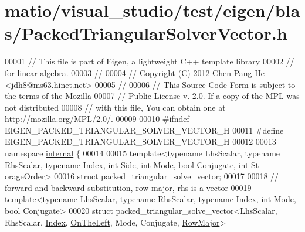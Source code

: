 \hypertarget{matio_2visual__studio_2test_2eigen_2blas_2_packed_triangular_solver_vector_8h_source}{}\section{matio/visual\+\_\+studio/test/eigen/blas/\+Packed\+Triangular\+Solver\+Vector.h}
\label{matio_2visual__studio_2test_2eigen_2blas_2_packed_triangular_solver_vector_8h_source}

\begin{DoxyCode}
00001 \textcolor{comment}{// This file is part of Eigen, a lightweight C++ template library}
00002 \textcolor{comment}{// for linear algebra.}
00003 \textcolor{comment}{//}
00004 \textcolor{comment}{// Copyright (C) 2012 Chen-Pang He <jdh8@ms63.hinet.net>}
00005 \textcolor{comment}{//}
00006 \textcolor{comment}{// This Source Code Form is subject to the terms of the Mozilla}
00007 \textcolor{comment}{// Public License v. 2.0. If a copy of the MPL was not distributed}
00008 \textcolor{comment}{// with this file, You can obtain one at http://mozilla.org/MPL/2.0/.}
00009 
00010 \textcolor{preprocessor}{#ifndef EIGEN\_PACKED\_TRIANGULAR\_SOLVER\_VECTOR\_H}
00011 \textcolor{preprocessor}{#define EIGEN\_PACKED\_TRIANGULAR\_SOLVER\_VECTOR\_H}
00012 
00013 \textcolor{keyword}{namespace }\hyperlink{namespaceinternal}{internal} \{
00014 
00015 \textcolor{keyword}{template}<\textcolor{keyword}{typename} LhsScalar, \textcolor{keyword}{typename} RhsScalar, \textcolor{keyword}{typename} Index, \textcolor{keywordtype}{int} S\textcolor{keywordtype}{id}e, \textcolor{keywordtype}{int} Mode, \textcolor{keywordtype}{bool} Conjugate, \textcolor{keywordtype}{int} St
      orageOrder>
00016 \textcolor{keyword}{struct }packed\_triangular\_solve\_vector;
00017 
00018 \textcolor{comment}{// forward and backward substitution, row-major, rhs is a vector}
00019 \textcolor{keyword}{template}<\textcolor{keyword}{typename} LhsScalar, \textcolor{keyword}{typename} RhsScalar, \textcolor{keyword}{typename} Index, \textcolor{keywordtype}{int} Mode, \textcolor{keywordtype}{bool} Conjugate>
00020 \textcolor{keyword}{struct }packed\_triangular\_solve\_vector<LhsScalar, RhsScalar, \hyperlink{namespace_eigen_a62e77e0933482dafde8fe197d9a2cfde}{Index}, 
      \hyperlink{group__enums_ggac22de43beeac7a78b384f99bed5cee0ba129609b3bdf23b071f5f86cf2f995ec4}{OnTheLeft}, Mode, Conjugate, \hyperlink{group__enums_ggaacded1a18ae58b0f554751f6cdf9eb13acfcde9cd8677c5f7caf6bd603666aae3}{RowMajor}>

\end{DoxyCode}
